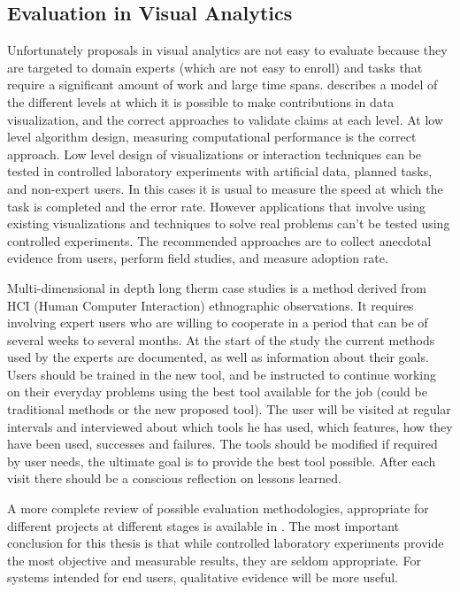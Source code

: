 \subsection{Evaluation in Visual Analytics}

Unfortunately proposals in visual analytics are not easy to evaluate because they are targeted to domain experts (which are not easy to enroll) and tasks that require a significant amount of work and large time spans. \autocite{munzner_nested_2009} describes a model of the different levels at which it is possible to make contributions in data visualization, and the correct approaches to validate claims at each level. At low level algorithm design, measuring computational performance is the correct approach. Low level design of visualizations or interaction techniques can be tested in controlled laboratory experiments with artificial data, planned tasks, and non-expert users. In this cases it is usual to measure the speed at which the task is completed and the error rate. However applications that involve using existing visualizations and techniques to solve real problems can't be tested using controlled experiments. The recommended approaches are to collect anecdotal evidence from users, perform field studies, and measure adoption rate.  
 
Multi-dimensional in depth long therm case studies \autocite{shneiderman_strategies_2006} is a method derived from HCI (Human Computer Interaction) ethnographic observations. It requires involving expert users who are willing to cooperate in a period that can be of several weeks to several months. At the start of the study the current methods used by the experts are documented, as well as information about their goals. Users should be trained in the new tool, and be instructed to continue working on their everyday problems using the best tool available for the job (could be traditional methods or the new proposed tool). The user will be visited at regular intervals and interviewed about which tools he has used, which features, how they have been used, successes and failures. The tools should be modified if required by user needs, the ultimate goal is to provide the best tool possible. After each visit there should be a conscious  reflection on lessons learned.

A more complete review of possible evaluation methodologies, appropriate for different projects at different stages is available in \autocite{lam_seven_2011}. The most important conclusion for this thesis is that while controlled laboratory experiments provide the most objective and measurable results, they are seldom appropriate. For systems intended for end users, qualitative evidence will be more useful.


